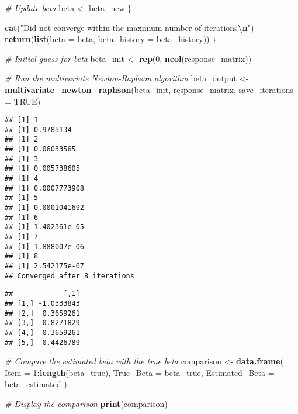 \documentclass[
]{article}
\newenvironment{Shaded}{\begin{snugshade}}{\end{snugshade}}
\newcommand{\AttributeTok}[1]{\textcolor[rgb]{0.13,0.29,0.53}{#1}}
\newcommand{\CommentTok}[1]{\textcolor[rgb]{0.56,0.35,0.01}{\textit{#1}}}
\newcommand{\ConstantTok}[1]{\textcolor[rgb]{0.56,0.35,0.01}{#1}}
\newcommand{\DecValTok}[1]{\textcolor[rgb]{0.00,0.00,0.81}{#1}}
\newcommand{\FunctionTok}[1]{\textcolor[rgb]{0.13,0.29,0.53}{\textbf{#1}}}
\newcommand{\NormalTok}[1]{#1}
\newcommand{\OtherTok}[1]{\textcolor[rgb]{0.56,0.35,0.01}{#1}}
\newcommand{\SpecialCharTok}[1]{\textcolor[rgb]{0.81,0.36,0.00}{\textbf{#1}}}
\newcommand{\StringTok}[1]{\textcolor[rgb]{0.31,0.60,0.02}{#1}}
\begin{document}
\begin{Shaded}
\begin{Highlighting}[]
    \CommentTok{\# Update beta}
\NormalTok{    beta }\OtherTok{\textless{}{-}}\NormalTok{ beta\_new}
\NormalTok{  \}}
  
  \FunctionTok{cat}\NormalTok{(}\StringTok{"Did not converge within the maximum number of iterations}\SpecialCharTok{\textbackslash{}n}\StringTok{"}\NormalTok{)}
  \FunctionTok{return}\NormalTok{(}\FunctionTok{list}\NormalTok{(}\AttributeTok{beta =}\NormalTok{ beta, }\AttributeTok{beta\_history =}\NormalTok{ beta\_history))}
\NormalTok{\}}

\CommentTok{\# Initial guess for beta}
\NormalTok{beta\_init }\OtherTok{\textless{}{-}} \FunctionTok{rep}\NormalTok{(}\DecValTok{0}\NormalTok{, }\FunctionTok{ncol}\NormalTok{(response\_matrix))}

\CommentTok{\# Run the multivariate Newton{-}Raphson algorithm}
\NormalTok{beta\_output }\OtherTok{\textless{}{-}} \FunctionTok{multivariate\_newton\_raphson}\NormalTok{(beta\_init, response\_matrix, }\AttributeTok{save\_iterations =} \ConstantTok{TRUE}\NormalTok{)}
\end{Highlighting}
\end{Shaded}

\begin{verbatim}
## [1] 1
## [1] 0.9785134
## [1] 2
## [1] 0.06033565
## [1] 3
## [1] 0.005738605
## [1] 4
## [1] 0.0007773908
## [1] 5
## [1] 0.0001041692
## [1] 6
## [1] 1.402361e-05
## [1] 7
## [1] 1.888007e-06
## [1] 8
## [1] 2.542175e-07
## Converged after 8 iterations
\end{verbatim}

\begin{Shaded}
\end{Shaded}

\begin{verbatim}
##            [,1]
## [1,] -1.0333843
## [2,]  0.3659261
## [3,]  0.8271829
## [4,]  0.3659261
## [5,] -0.4426789
\end{verbatim}

\begin{Shaded}
\begin{Highlighting}[]
\CommentTok{\# Compare the estimated beta with the true beta}
\NormalTok{comparison }\OtherTok{\textless{}{-}} \FunctionTok{data.frame}\NormalTok{(}
  \AttributeTok{Item =} \DecValTok{1}\SpecialCharTok{:}\FunctionTok{length}\NormalTok{(beta\_true),}
  \AttributeTok{True\_Beta =}\NormalTok{ beta\_true,}
  \AttributeTok{Estimated\_Beta =}\NormalTok{ beta\_estimated}
\NormalTok{)}

\CommentTok{\# Display the comparison}
\FunctionTok{print}\NormalTok{(comparison)}
\end{Highlighting}
\end{Shaded}
\end{document}
